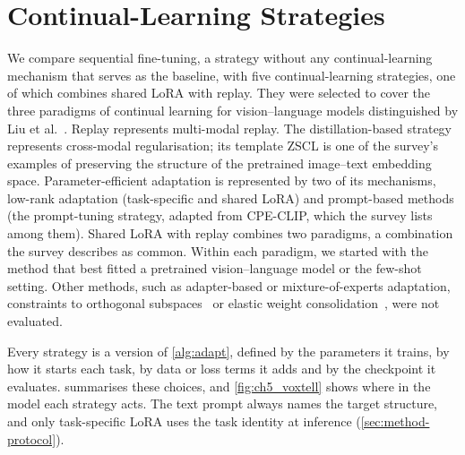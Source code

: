 \section{Continual-Learning Strategies}
\label{sec:method-strategies}

We compare sequential fine-tuning, a strategy without any continual-learning mechanism that serves as the baseline, with five continual-learning strategies, one of which combines shared LoRA with replay.
They were selected to cover the three paradigms of continual learning for vision--language models distinguished by Liu et al.~\cite[Sec.~4]{liu2026continuallearningvlmssurvey}.
Replay represents multi-modal replay.
The distillation-based strategy represents cross-modal regularisation; its template ZSCL is one of the survey's examples of preserving the structure of the pretrained image--text embedding space.
Parameter-efficient adaptation is represented by two of its mechanisms, low-rank adaptation (task-specific and shared LoRA) and prompt-based methods (the prompt-tuning strategy, adapted from CPE-CLIP, which the survey lists among them).
Shared LoRA with replay combines two paradigms, a combination the survey describes as common.
Within each paradigm, we started with the method that best fitted a pretrained vision--language model or the few-shot setting.
Other methods, such as adapter-based or mixture-of-experts adaptation, constraints to orthogonal subspaces~\cite[Sec.~4]{liu2026continuallearningvlmssurvey} or elastic weight consolidation~\cite{Kirkpatrick_2017}, were not evaluated.

Every strategy is a version of \cref{alg:adapt}, defined by the parameters it trains, by how it starts each task, by data or loss terms it adds and by the checkpoint it evaluates.
 summarises these choices, and \cref{fig:ch5_voxtell} shows where in the model each strategy acts.
The text prompt always names the target structure, and only task-specific LoRA uses the task identity at inference (\cref{sec:method-protocol}).

\begin{table}[tb]
\centering
\caption[Overview of the continual-learning strategies]{Overview of the continual-learning strategies as instances of \cref{alg:adapt}. ``Best validation'': checkpoint of the epoch with the lowest validation loss; ``last epoch'': parameters after the last epoch (\cref{sec:method-adaptation}). In every strategy, the next task starts from the parameters after the last epoch.}
\label{tab:method-strategies}

\end{table}

